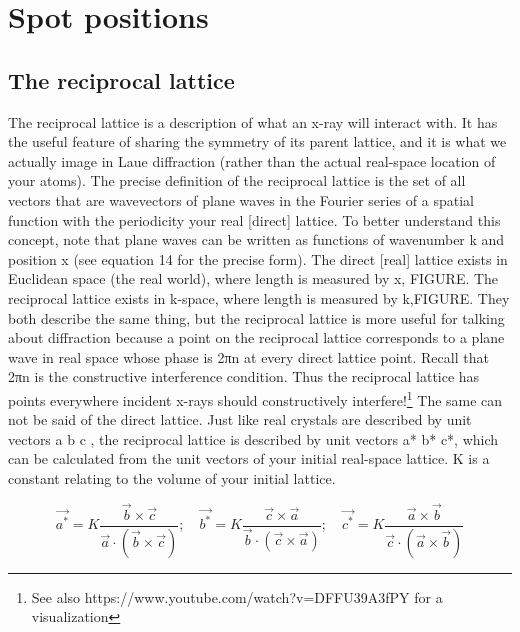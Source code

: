 \section{Spot positions}
\subsection{The reciprocal lattice}
The reciprocal lattice is a description of what an x-ray will interact with. It has the useful feature of sharing the symmetry of its parent lattice, and it is what we actually image in Laue diffraction (rather than the actual real-space location of your atoms). The precise definition of the reciprocal lattice is the set of all vectors that are wavevectors of plane waves in the Fourier series of a spatial function with the periodicity your real [direct] lattice.
To better understand this concept, note that plane waves can be written as functions of wavenumber k and position x (see equation 14 for the precise form). The direct [real] lattice exists in Euclidean space (the real world), where length is measured by x, FIGURE. The reciprocal lattice exists in k-space, where length is measured by k,FIGURE. They both describe the same thing, but the reciprocal lattice is more useful for talking about diffraction because a point on the reciprocal lattice corresponds to a plane wave in real space whose phase is 2πn at every direct lattice point. Recall that 2πn is the constructive interference condition. Thus the reciprocal lattice has points everywhere incident x-rays should constructively interfere!\footnote{See also https://www.youtube.com/watch?v=DFFU39A3fPY for a visualization} The same can not be said of the direct lattice.
Just like real crystals are described by unit vectors a b c , the reciprocal lattice is described by unit vectors a* b* c*, which can be calculated from the unit vectors of your initial real-space lattice. K is a constant relating to the volume of your initial lattice.

\begin{equation}
    \vec{a^*}=K\frac{\vec{b}\times\vec{c}}{\vec{a}\cdot(\vec{b}\times\vec{c})};\quad
    \vec{b^*}=K\frac{\vec{c}\times\vec{a}}{\vec{b}\cdot(\vec{c}\times\vec{a})};\quad
    \vec{c^*}=K\frac{\vec{a}\times\vec{b}}{\vec{c}\cdot(\vec{a}\times\vec{b})}
    \label{RecipLatVecs}
\end{equation}

